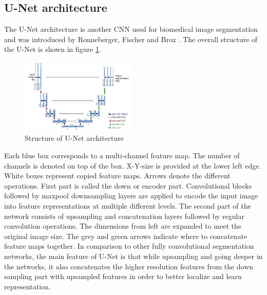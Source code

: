 \subsection{U-Net architecture}
The U-Net architecture is another CNN used for biomedical image segmentation and was introduced by Ronneberger, Fischer and Brox \cite{unet}. The overall structure of the U-Net is shown in figure \ref{unetstructure}.\newline
\begin{figure}[h!]
	\includegraphics[width=0.49\textwidth, angle=0]{files/unetstructure.jpg}
	\caption{Structure of U-Net architecture \cite{unet}}
	\label{unetstructure}
\end{figure}

Each blue box corresponds to a multi-channel feature map. The number of channels is denoted on top of the box. X-Y-size is provided at the lower left edge. White boxes represent copied feature maps. Arrows denote the different operations.\newline
First part is called the down or encoder part. Convolutional blocks followed by maxpool downsampling layers are applied to encode the input image into feature representations at multiple different levels. The second part of the network consists of upsampling and concatenation layers followed by regular convolution operations. The dimensions from left are expanded to meet the original image size. The grey and green arrows indicate where to concatenate feature maps together.\newline
In comparison to other fully convolutional segmentation networks, the main feature of U-Net is that while upsampling and going deeper in the networks, it also concatenates the higher resolution features from the down sampling part with upsampled features in order to better localize and learn representation.\newline

